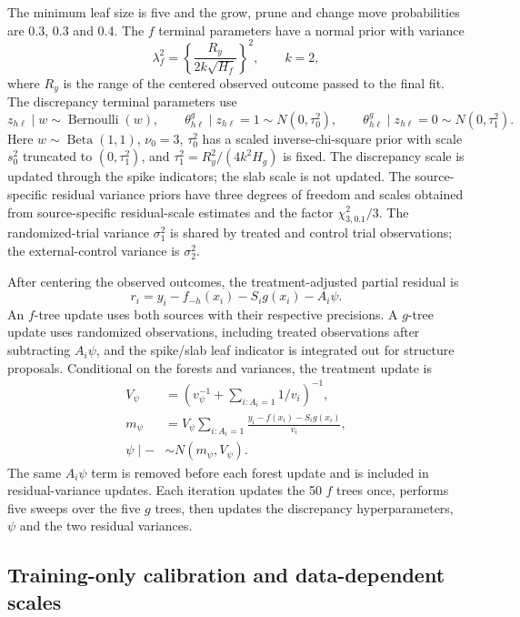 \documentclass[11pt]{article}
\theoremstyle{remark}\newtheorem{remark}{Remark}[section]
\providecommand{\DIFaddtex}[1]{{\protect\color{blue} \sf #1}} %
\providecommand{\DIFadd}[1]{\texorpdfstring{\DIFaddtex{#1}}{#1}} %
\begin{document}
\DIFadd{The minimum leaf size is five and the grow, prune and change move probabilities are 0.3, 0.3 and 0.4. The $f$ terminal parameters have a normal prior with variance
}\[
 \lambda_f^2=\left\{\frac{R_y}{2k\sqrt{H_f}}\right\}^2,
 \qquad k=2,
\]
\DIFadd{where $R_y$ is the range of the centered observed outcome passed to the final fit. The discrepancy terminal parameters use
}\[
 z_{h\ell}\mid w\sim\operatorname{Bernoulli}(w),\qquad
 \theta^g_{h\ell}\mid z_{h\ell}=1\sim N(0,\tau_0^2),\qquad
 \theta^g_{h\ell}\mid z_{h\ell}=0\sim N(0,\tau_1^2).
\]
\DIFadd{Here $w\sim\operatorname{Beta}(1,1)$, $\nu_0=3$, $\tau_0^2$ has a scaled inverse-chi-square prior with scale $s_0^2$ truncated to $(0,\tau_1^2)$, and $\tau_1^2=R_y^2/(4k^2H_g)$ is fixed. The discrepancy scale is updated through the spike indicators; the slab scale is not updated. The source-specific residual variance priors have three degrees of freedom and scales obtained from source-specific residual-scale estimates and the factor $\chi^2_{3,0.1}/3$. The randomized-trial variance $\sigma_1^2$ is shared by treated and control trial observations; the external-control variance is $\sigma_2^2$.
}

\DIFadd{After centering the observed outcomes, the treatment-adjusted partial residual is
}\[
 r_i=y_i-f_{-h}(x_i)-S_i g(x_i)-A_i\psi.
\]
\DIFadd{An $f$-tree update uses both sources with their respective precisions. A $g$-tree update uses randomized observations, including treated observations after subtracting $A_i\psi$, and the spike/slab leaf indicator is integrated out for structure proposals. Conditional on the forests and variances, the treatment update is
}\begin{equation}
\begin{aligned}
 V_\psi&=\left(v_\psi^{-1}+\sum_{i:A_i=1}1/v_i\right)^{-1},\\
 m_\psi&=V_\psi\sum_{i:A_i=1}\frac{y_i-f(x_i)-S_i g(x_i)}{v_i},\\
 \psi\mid-&\sim N(m_\psi,V_\psi).
\end{aligned}
\label{eq:joint_app_psi}
\end{equation}
\DIFadd{The same $A_i\psi$ term is removed before each forest update and is included in residual-variance updates. Each iteration updates the 50 $f$ trees once, performs five sweeps over the five $g$ trees, then updates the discrepancy hyperparameters, $\psi$ and the two residual variances.
}

\subsection{\DIFadd{Training-only calibration and data-dependent scales}}
\end{document}
